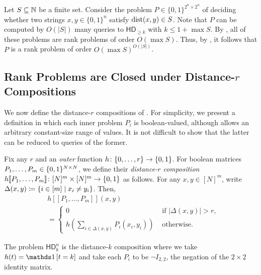 \documentclass[conference]{IEEEtran}
\newcommand{\HD}[1]{\mathsf{HD}_{#1}}
\begin{document}
\begin{example}
	Let $S\subseteq \mathbb{N}$ be a finite set. Consider the problem $P\in\{0,1\}^{2^n\times 2^n}$ of deciding whether two strings $x,y\in \{0,1\}^n$ satisfy $\operatorname{dist}(x,y)\in S$. Note that $P$ can be computed by $O(|S|)$ many queries to $\HD{\geq k}$ with $k\leq 1+\max S$. By , all of these problems are rank problems of order $O(\max S)$. Thus, by , it follows that $P$ is a rank problem of order $O(\max S)^{O(|S|)}$.
\end{example}

\subsection{Rank Problems are Closed under Distance-\texorpdfstring{$r$}{r} Compositions}
\label{section:rank-closure-composition}

We now define the distance-$r$ compositions of \cite{FGHH25}. For simplicity, we
present a definition in which each inner problem $P_i$ is boolean-valued,
although \cite{FGHH25} allows an arbitrary constant-size range of values. It is
not difficult to show that the latter can be reduced to queries of the former.

\newcommand{\ldsbracket}{[\![}
\newcommand{\rdsbracket}{]\!]}
\begin{definition}
\label{def:distance-r-composition}
Fix any $r$ and an \emph{outer} function $h \colon \{0, \dotsc, r\} \to
\{0,1\}$. For boolean matrices $P_1, \dotsc, P_m \in \{0,1\}^{N \times N}$, we define their
\emph{distance-$r$ composition}
$h \ldsbracket P_1, \dotsc, P_m \rdsbracket \colon [N]^m \times [N]^m \to \zo$
as follows. For any $x,y \in [N]^m$, write $\Delta(x,y) \coloneqq \{ i \in [m] \;|\; x_i \neq y_i \}$. Then,
\begin{align*}
    &h\ldsbracket P_1, \dotsc, P_m \rdsbracket (x,y)\\
    &=\begin{cases}
        0 &\text{ if } |\Delta(x,y)| > r, \\
        h\left(\sum_{i \in \Delta(x,y)} P_i(x_i, y_i) \right) &\text{ otherwise.}
    \end{cases}
\end{align*}
\end{definition}

\begin{example}
    The problem $\HD{k}^n$ is the distance-$k$ composition where we take $h(t) =\ind{t=k}$ and take each $P_i$ to be $\neg I_{2,2}$, the negation of the $2 \times 2$ identity matrix.
\end{example}
\end{document}
